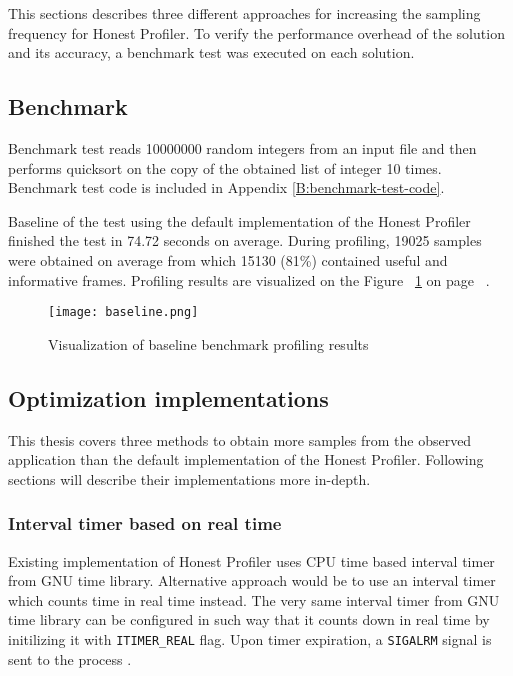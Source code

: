 \documentclass[..thesis.tex]{subfiles}
\begin{document}
This sections describes three different approaches for increasing the sampling frequency for Honest Profiler. To verify the performance overhead of the solution and its accuracy, a benchmark test was executed on each solution.

\subsection{Benchmark}
Benchmark test reads 10000000 random integers from an input file and then performs quicksort on the copy of the obtained list of integer 10 times. Benchmark test code is included in Appendix \ref{B:benchmark-test-code}. 

Baseline of the test using the default implementation of the Honest Profiler finished the test in 74.72 seconds on average. During profiling, 19025 samples were obtained on average from which 15130 (81\%) contained useful and informative frames. Profiling results are visualized on the Figure ~\ref{fig:baseline} on page ~\pageref{fig:baseline}.

\begin{figure}[H]
\texttt{[image: baseline.png]}
\caption{Visualization of baseline benchmark profiling results}
\label{fig:baseline}
\end{figure}

\subsection{Optimization implementations}
This thesis covers three methods to obtain more samples from the observed application than  the default implementation of the Honest Profiler. Following sections will describe their implementations more in-depth.

\subsubsection{Interval timer based on real time}
Existing implementation of Honest Profiler uses CPU time based interval timer from GNU time library. Alternative approach would be to use an interval timer which counts time in real time instead. The very same interval timer from GNU time library can be configured in such way that it counts down in real time by initilizing it with \texttt{ITIMER\_REAL} flag. Upon timer expiration, a \texttt{SIGALRM} signal is sent to the process \cite{getitimer2}.
\end{document}
